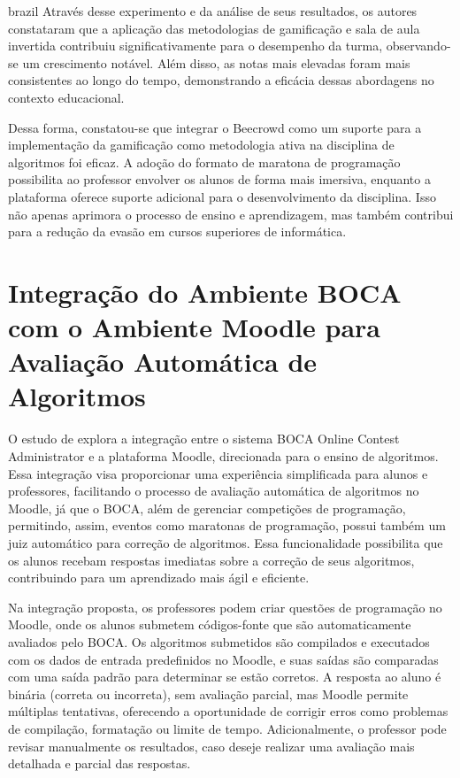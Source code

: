 \begin{otherlanguage*}{brazil}
Através desse experimento e da análise de seus resultados, os autores constataram que a aplicação das metodologias de gamificação e sala de aula invertida contribuiu significativamente para o desempenho da turma, observando-se um crescimento notável. Além disso, as notas mais elevadas foram mais consistentes ao longo do tempo, demonstrando a eficácia dessas abordagens no contexto educacional.

Dessa forma, constatou-se que integrar o Beecrowd como um suporte para a implementação da gamificação como metodologia ativa na disciplina de algoritmos foi eficaz. A adoção do formato de maratona de programação possibilita ao professor envolver os alunos de forma mais imersiva, enquanto a plataforma oferece suporte adicional para o desenvolvimento da disciplina. Isso não apenas aprimora o processo de ensino e aprendizagem, mas também contribui para a redução da evasão em cursos superiores de informática.



\section{Integração do Ambiente BOCA com o Ambiente Moodle para Avaliação Automática de Algoritmos}

O estudo de \textcite{galasso} explora a integração entre o sistema BOCA Online Contest Administrator e a plataforma Moodle, direcionada para o ensino de algoritmos. Essa integração visa proporcionar uma experiência simplificada para alunos e professores, facilitando o processo de avaliação automática de algoritmos no Moodle, já que o BOCA, além de gerenciar competições de programação, permitindo, assim, eventos como maratonas de programação, possui também um juiz automático para correção de algoritmos. Essa funcionalidade possibilita que os alunos recebam respostas imediatas sobre a correção de seus algoritmos, contribuindo para um aprendizado mais ágil e eficiente.

Na integração proposta, os professores podem criar questões de programação no Moodle, onde os alunos submetem códigos-fonte que são automaticamente avaliados pelo BOCA. Os algoritmos submetidos são compilados e executados com os dados de entrada predefinidos no Moodle, e suas saídas são comparadas com uma saída padrão para determinar se estão corretos. A resposta ao aluno é binária (correta ou incorreta), sem avaliação parcial, mas Moodle permite múltiplas tentativas, oferecendo a oportunidade de corrigir erros como problemas de compilação, formatação ou limite de tempo. Adicionalmente, o professor pode revisar manualmente os resultados, caso deseje realizar uma avaliação mais detalhada e parcial das respostas.


\end{otherlanguage*}
